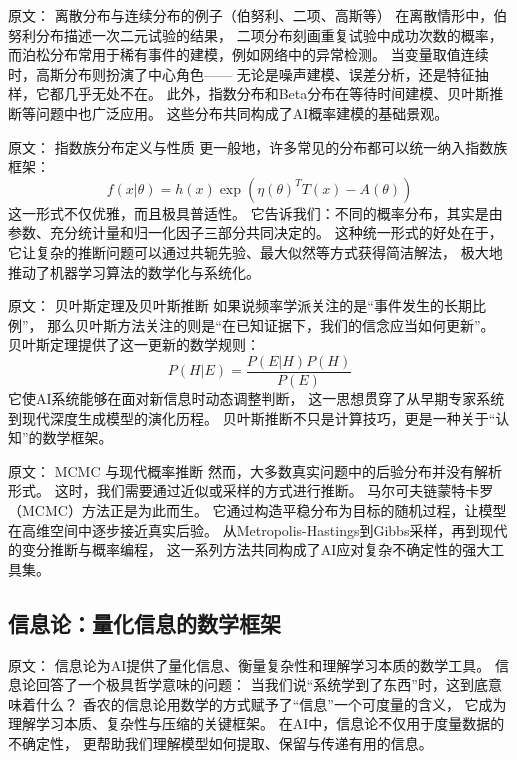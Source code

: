 原文：
离散分布与连续分布的例子（伯努利、二项、高斯等）
在离散情形中，伯努利分布描述一次二元试验的结果，  
二项分布刻画重复试验中成功次数的概率，  
而泊松分布常用于稀有事件的建模，例如网络中的异常检测。  
当变量取值连续时，高斯分布则扮演了中心角色——  
无论是噪声建模、误差分析，还是特征抽样，它都几乎无处不在。  
此外，指数分布和Beta分布在等待时间建模、贝叶斯推断等问题中也广泛应用。  
这些分布共同构成了AI概率建模的基础景观。



原文：
指数族分布定义与性质
更一般地，许多常见的分布都可以统一纳入指数族框架：
$$f(x|\theta) = h(x)\exp(\eta(\theta)^T T(x) - A(\theta))$$
这一形式不仅优雅，而且极具普适性。  
它告诉我们：不同的概率分布，其实是由参数、充分统计量和归一化因子三部分共同决定的。  
这种统一形式的好处在于，它让复杂的推断问题可以通过共轭先验、最大似然等方式获得简洁解法，  
极大地推动了机器学习算法的数学化与系统化。



原文：
贝叶斯定理及贝叶斯推断
如果说频率学派关注的是“事件发生的长期比例”，  
那么贝叶斯方法关注的则是“在已知证据下，我们的信念应当如何更新”。  
贝叶斯定理提供了这一更新的数学规则：
$$P(H|E) = \frac{P(E|H)P(H)}{P(E)}$$
它使AI系统能够在面对新信息时动态调整判断，  
这一思想贯穿了从早期专家系统到现代深度生成模型的演化历程。  
贝叶斯推断不只是计算技巧，更是一种关于“认知”的数学框架。



原文：
MCMC 与现代概率推断
然而，大多数真实问题中的后验分布并没有解析形式。  
这时，我们需要通过近似或采样的方式进行推断。  
马尔可夫链蒙特卡罗（MCMC）方法正是为此而生。  
它通过构造平稳分布为目标的随机过程，让模型在高维空间中逐步接近真实后验。  
从Metropolis-Hastings到Gibbs采样，再到现代的变分推断与概率编程，  
这一系列方法共同构成了AI应对复杂不确定性的强大工具集。



\subsection{信息论：量化信息的数学框架}

原文：
信息论为AI提供了量化信息、衡量复杂性和理解学习本质的数学工具。
信息论回答了一个极具哲学意味的问题：  
当我们说“系统学到了东西”时，这到底意味着什么？  
香农的信息论用数学的方式赋予了“信息”一个可度量的含义，  
它成为理解学习本质、复杂性与压缩的关键框架。  
在AI中，信息论不仅用于度量数据的不确定性，  
更帮助我们理解模型如何提取、保留与传递有用的信息。




